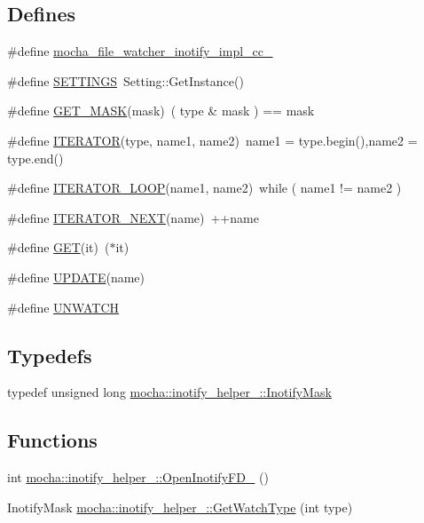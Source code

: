 \subsection*{Defines}
\begin{DoxyCompactItemize}
\item 
\#define \hyperlink{file__watcher-inotify-impl_8cc_a30482aa248568ad0cc101ec99f16ccde}{mocha\_\-file\_\-watcher\_\-inotify\_\-impl\_\-cc\_\-}
\item 
\#define \hyperlink{file__watcher-inotify-impl_8cc_aa2d5c758628dddfa26e73ca5a245222a}{SETTINGS}~Setting::GetInstance()
\item 
\#define \hyperlink{file__watcher-inotify-impl_8cc_a69654895e069baa5ac52071dfecac957}{GET\_\-MASK}(mask)~( type \& mask ) == mask
\item 
\#define \hyperlink{file__watcher-inotify-impl_8cc_afe1eee8f4fde68229d350271a0308b1b}{ITERATOR}(type, name1, name2)~name1 = type.begin(),name2 = type.end()
\item 
\#define \hyperlink{file__watcher-inotify-impl_8cc_af5c7e639f4d066422b1e9b2dac32f6ce}{ITERATOR\_\-LOOP}(name1, name2)~while ( name1 != name2 )
\item 
\#define \hyperlink{file__watcher-inotify-impl_8cc_abc88874e7507dbc512511050cf90c2b2}{ITERATOR\_\-NEXT}(name)~++name
\item 
\#define \hyperlink{file__watcher-inotify-impl_8cc_af77a401ecadfcd3e71c2481652cd5f6d}{GET}(it)~($\ast$it)
\item 
\#define \hyperlink{file__watcher-inotify-impl_8cc_ac064943fe2b39a99631a30adfe41a543}{UPDATE}(name)
\item 
\#define \hyperlink{file__watcher-inotify-impl_8cc_a913cb0da7f62fd2a3016ba62ac18dd5c}{UNWATCH}
\end{DoxyCompactItemize}
\subsection*{Typedefs}
\begin{DoxyCompactItemize}
\item 
typedef unsigned long \hyperlink{namespacemocha_1_1inotify__helper___aa8d25eea9099a062f693484523e0d508}{mocha::inotify\_\-helper\_\-::InotifyMask}
\end{DoxyCompactItemize}
\subsection*{Functions}
\begin{DoxyCompactItemize}
\item 
int \hyperlink{namespacemocha_1_1inotify__helper___a7c9694e0500321b1856f15e64556a1d4}{mocha::inotify\_\-helper\_\-::OpenInotifyFD\_\-} ()
\item 
InotifyMask \hyperlink{namespacemocha_1_1inotify__helper___ac978057f9a7394984b74291ccd2e575f}{mocha::inotify\_\-helper\_\-::GetWatchType} (int type)
\end{DoxyCompactItemize}


